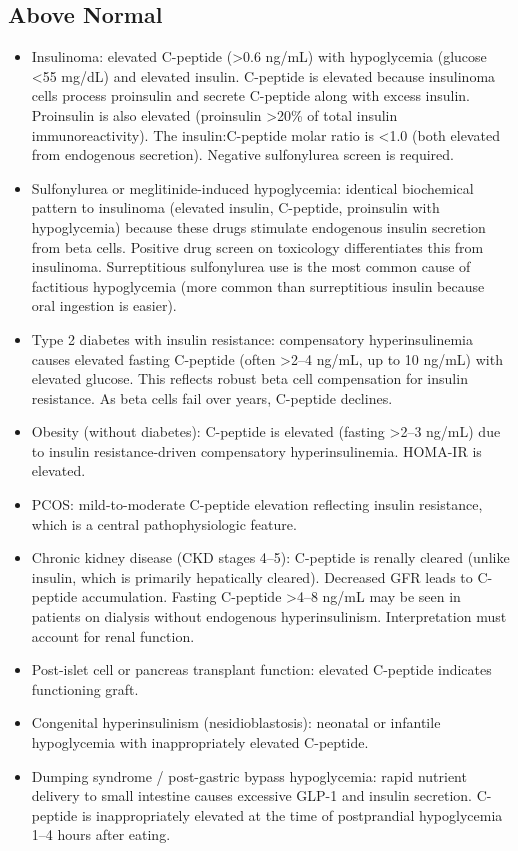 \subsection*{Above Normal}
\begin{itemize}
  \item Insulinoma: elevated C-peptide (>0.6 ng/mL) with hypoglycemia (glucose <55 mg/dL) and elevated insulin. C-peptide is elevated because insulinoma cells process proinsulin and secrete C-peptide along with excess insulin. Proinsulin is also elevated (proinsulin >20\% of total insulin immunoreactivity). The insulin:C-peptide molar ratio is <1.0 (both elevated from endogenous secretion). Negative sulfonylurea screen is required.
  \item Sulfonylurea or meglitinide-induced hypoglycemia: identical biochemical pattern to insulinoma (elevated insulin, C-peptide, proinsulin with hypoglycemia) because these drugs stimulate endogenous insulin secretion from beta cells. Positive drug screen on toxicology differentiates this from insulinoma. Surreptitious sulfonylurea use is the most common cause of factitious hypoglycemia (more common than surreptitious insulin because oral ingestion is easier).
  \item Type 2 diabetes with insulin resistance: compensatory hyperinsulinemia causes elevated fasting C-peptide (often >2--4 ng/mL, up to 10 ng/mL) with elevated glucose. This reflects robust beta cell compensation for insulin resistance. As beta cells fail over years, C-peptide declines.
  \item Obesity (without diabetes): C-peptide is elevated (fasting >2--3 ng/mL) due to insulin resistance-driven compensatory hyperinsulinemia. HOMA-IR is elevated.
  \item PCOS: mild-to-moderate C-peptide elevation reflecting insulin resistance, which is a central pathophysiologic feature.
  \item Chronic kidney disease (CKD stages 4--5): C-peptide is renally cleared (unlike insulin, which is primarily hepatically cleared). Decreased GFR leads to C-peptide accumulation. Fasting C-peptide >4--8 ng/mL may be seen in patients on dialysis without endogenous hyperinsulinism. Interpretation must account for renal function.
  \item Post-islet cell or pancreas transplant function: elevated C-peptide indicates functioning graft.
  \item Congenital hyperinsulinism (nesidioblastosis): neonatal or infantile hypoglycemia with inappropriately elevated C-peptide.
  \item Dumping syndrome / post-gastric bypass hypoglycemia: rapid nutrient delivery to small intestine causes excessive GLP-1 and insulin secretion. C-peptide is inappropriately elevated at the time of postprandial hypoglycemia 1--4 hours after eating.
\end{itemize}

